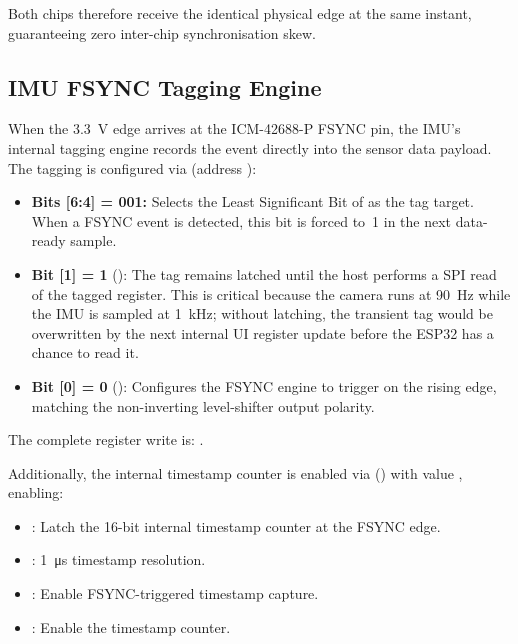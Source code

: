 Both chips therefore receive the identical physical edge at the same instant, guaranteeing zero inter-chip synchronisation skew.


\subsection{IMU FSYNC Tagging Engine}\label{sec:fsync_tagging}

When the \SI{3.3}{\volt} edge arrives at the ICM-42688-P FSYNC pin, the IMU's internal tagging engine records the event directly into the sensor data payload.
The tagging is configured via  (address ):

\begin{itemize}[nosep]
  \item \textbf{Bits [6:4] = 001:} Selects the Least Significant Bit of  as the tag target. When a FSYNC event is detected, this bit is forced to~1 in the next data-ready sample.
  \item \textbf{Bit [1] = 1} (): The tag remains latched until the host performs a SPI read of the tagged register. This is critical because the camera runs at \SI{90}{\hertz} while the IMU is sampled at \SI{1}{\kilo\hertz}; without latching, the transient tag would be overwritten by the next internal UI register update before the ESP32 has a chance to read it.
  \item \textbf{Bit [0] = 0} (): Configures the FSYNC engine to trigger on the rising edge, matching the non-inverting level-shifter output polarity.
\end{itemize}

The complete register write is: .

Additionally, the internal timestamp counter is enabled via  () with value , enabling:
\begin{itemize}[nosep]
  \item {}: Latch the 16-bit internal timestamp counter at the FSYNC edge.
  \item {}: \SI{1}{\micro\second} timestamp resolution.
  \item {}: Enable FSYNC-triggered timestamp capture.
  \item {}: Enable the timestamp counter.
\end{itemize}

